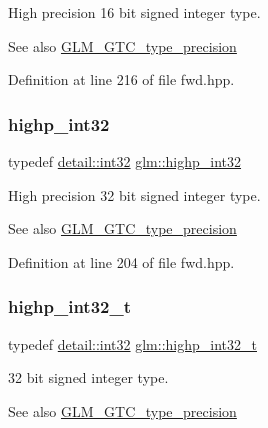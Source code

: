 High precision 16 bit signed integer type. \begin{DoxySeeAlso}{See also}
\mbox{\hyperlink{group__gtc__type__precision}{G\+L\+M\+\_\+\+G\+T\+C\+\_\+type\+\_\+precision}} 
\end{DoxySeeAlso}


Definition at line 216 of file fwd.\+hpp.

\mbox{\label{group__gtc__type__precision_gaa2045c92b9553d463191af6a20e997bb}} 
\subsubsection{\texorpdfstring{highp\_int32}{highp\_int32}}
{\footnotesize\ttfamily typedef \mbox{\hyperlink{namespaceglm_1_1detail_a9f85b4efeca416cdcec2fd08939a2e17}{detail\+::int32}} \mbox{\hyperlink{group__gtc__type__precision_gaa2045c92b9553d463191af6a20e997bb}{glm\+::highp\+\_\+int32}}}

High precision 32 bit signed integer type. \begin{DoxySeeAlso}{See also}
\mbox{\hyperlink{group__gtc__type__precision}{G\+L\+M\+\_\+\+G\+T\+C\+\_\+type\+\_\+precision}} 
\end{DoxySeeAlso}


Definition at line 204 of file fwd.\+hpp.

\mbox{\label{group__gtc__type__precision_ga783d077a513c1f475f6cdb406b4238c3}} 
\subsubsection{\texorpdfstring{highp\_int32\_t}{highp\_int32\_t}}
{\footnotesize\ttfamily typedef \mbox{\hyperlink{namespaceglm_1_1detail_a9f85b4efeca416cdcec2fd08939a2e17}{detail\+::int32}} \mbox{\hyperlink{group__gtc__type__precision_ga783d077a513c1f475f6cdb406b4238c3}{glm\+::highp\+\_\+int32\+\_\+t}}}

32 bit signed integer type. \begin{DoxySeeAlso}{See also}
\mbox{\hyperlink{group__gtc__type__precision}{G\+L\+M\+\_\+\+G\+T\+C\+\_\+type\+\_\+precision}} 
\end{DoxySeeAlso}


